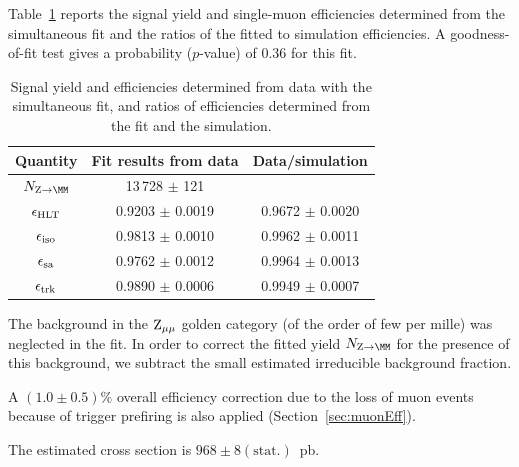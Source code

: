 Table~\ref{fig:fitRes_36pb} reports the signal yield and single-muon efficiencies determined from
the simultaneous fit and the ratios of the fitted to simulation efficiencies.
A goodness-of-fit test gives a probability ($p$-value) of 0.36 for this fit.


\begin{table}[htbp] %
\begin{center}
\caption{Signal yield and efficiencies determined from data with the simultaneous fit, and
  ratios of efficiencies determined from the fit and the simulation.}
\label{fig:fitRes_36pb}
\begin{tabular}{|c|c|c|}
\hline
Quantity & Fit results from data & Data/simulation\\
\hline\hline
$\NZtomumu$ &13\,728 $\pm$ 121   & \\
\hline
$\epsilon_\mathrm{HLT}$ & 0.9203 $\pm$ 0.0019  &0.9672 $\pm$ 0.0020   \\
$\epsilon_\mathrm{iso}$ & 0.9813 $\pm$ 0.0010& 0.9962 $\pm$  0.0011 \\
$\epsilon_\mathrm{sa}$ & 0.9762  $\pm$ 0.0012 & 0.9964 $\pm$ 0.0013 \\
$\epsilon_\mathrm{trk}$ & 0.9890 $\pm$ 0.0006  & 0.9949 $\pm$ 0.0007  \\
\hline
\end{tabular}
\end{center}
\end{table}


The background in the $\mathrm{Z}_{\mu\mu}$ golden category (of the order of few per mille)
was neglected in the fit. In order to correct the fitted yield $\NZtomumu$ for
the presence of this background, we subtract the small estimated irreducible
background fraction.

A $(1.0\pm 0.5)\%$ overall efficiency correction due to the loss of muon events because of trigger
prefiring is also applied (Section~\ref{sec:muonEff}).

The estimated cross section is $968\pm 8 \mathrm{(stat.)}$~pb.
